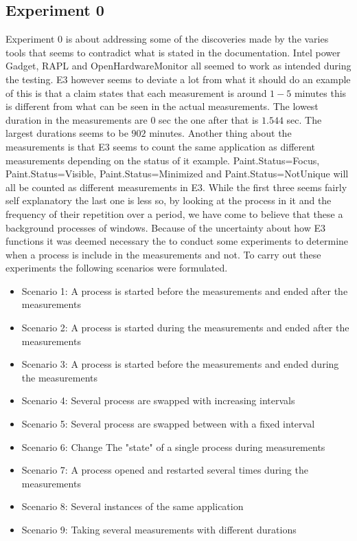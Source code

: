 \subsection{Experiment 0}
Experiment 0 is about addressing some of the discoveries made by the varies tools that seems to contradict what is stated in the documentation.
Intel power Gadget, RAPL and OpenHardwareMonitor all seemed to work as intended during the testing. E3 however seems to deviate a lot from what it should do an example of this is that a claim states that each measurement is around $1-5$ minutes this is different from what can be seen in the actual measurements. The lowest duration in the measurements are $0$ sec the one after that is $1.544$ sec. The largest durations seems to be $902$ minutes. Another thing about the measurements is that E3 seems to count the same application as different measurements depending on the status of it example. Paint.Status=Focus, Paint.Status=Visible, Paint.Status=Minimized and Paint.Status=NotUnique will all be counted as different measurements in E3. While the first three seems fairly self explanatory the last one is less so, by looking at the process in it and the frequency of their repetition over a period, we have come to believe that these a background processes of windows. 
Because of the uncertainty about how E3 functions it was deemed necessary the to conduct some experiments to determine when a process is include in the measurements and not. To carry out these experiments the following scenarios were formulated.
\begin{itemize}
    \item Scenario 1: A process is started before the measurements and ended after the measurements
    \item Scenario 2: A process is started during the measurements and ended after the measurements
    \item Scenario 3: A process is started before the measurements and ended during the measurements
    \item Scenario 4: Several process are swapped with increasing intervals
    \item Scenario 5: Several process are swapped between with a fixed interval
    \item Scenario 6: Change The "state" of a single process during measurements
    \item Scenario 7: A process opened and restarted several times during the measurements
    \item Scenario 8: Several instances of the same application
    \item Scenario 9: Taking several measurements with different durations
\end{itemize}
